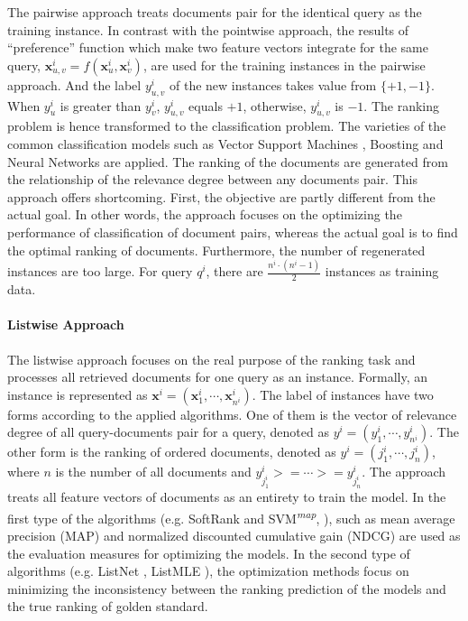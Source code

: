 The pairwise approach treats documents pair for the identical query as the training instance. In contrast with the pointwise approach, the results of ``preference'' function which make two feature vectors integrate for the same query, $\mathbf{x}_{u, v}^i = f(\mathbf{x}_u^i, \mathbf{x}_v^i)$, are used for the training instances in the pairwise approach. And the label $y_{u,v}^i$ of the new instances takes value from $\{+1, -1\}$. When $y_u^i$ is greater than $y_v^i$, $y_{u,v}^i$ equals $+1$, otherwise, $y_{u,v}^i$ is $-1$. The ranking problem is hence transformed to the classification problem. The varieties of the common classification models such as Vector Support Machines \citep{joachims2002optimizing}, Boosting \citep{freund2003efficient} and Neural Networks \citep{tsai2007frank} are applied. The ranking of the documents are generated from the relationship of the relevance degree between any documents pair. This approach offers shortcoming. First, the objective are partly different from the actual goal. In other words, the approach focuses on the optimizing the performance of classification of document pairs, whereas the actual goal is to find the optimal ranking of documents. Furthermore, the number of regenerated instances are too large. For query $q^i$, there are $\frac{n^i\cdot(n^i-1)}{2}$ instances as training data. 

\paragraph{Listwise Approach}

The listwise approach focuses on the real purpose of the ranking task and processes all retrieved documents for one query as an instance. Formally, an instance is represented as $\mathbf{x}^i = (\mathbf{x}_1^i, \cdots, \mathbf{x}_{n^i}^i)$. The label of instances have two forms according to the applied algorithms. One of them is the vector of relevance degree of all query-documents pair for a query, denoted as $y^i=(y_1^i, \cdots, y_{n^i}^i)$. The other form is the ranking of ordered documents, denoted as $y^i=(j_1^i, \cdots, j_{n}^i)$, where $n$ is the number of all documents and $y_{j_1^i}^i >= \cdots >= y_{j_n^i}^i$. The approach treats all feature vectors of documents as an entirety to train the model. In the first type of the algorithms (e.g. SoftRank \citep{taylor2008softrank} and SVM\textsuperscript{\textit{map}},  \citep{yu2005svm}), such as mean average precision (MAP) and normalized discounted cumulative gain (NDCG) are used as the evaluation measures for optimizing the models. In the second type of algorithms (e.g. ListNet \citep{cao2007learning}, ListMLE \citep{xia2008listwise}), the optimization methods focus on minimizing the inconsistency between the ranking prediction of the models and the true ranking of golden standard. 


